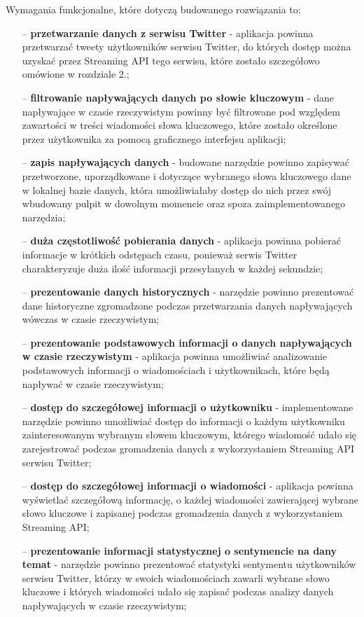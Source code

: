 Wymagania funkcjonalne, które dotyczą budowanego rozwiązania to: 
\begin{itemize}
	\item[--] \textbf{przetwarzanie danych z serwisu Twitter} - aplikacja powinna przetwarzać tweety użytkowników serwisu Twitter, do których dostęp można uzyskać przez Streaming API tego serwisu, które zostało szczegółowo omówione w rozdziale 2.; 
	\item[--] \textbf{filtrowanie napływających danych po słowie kluczowym} - dane napływające w czasie rzeczywistym powinny być filtrowane pod względem zawartości w treści wiadomości słowa kluczowego, które zostało określone przez użytkownika za pomocą graficznego interfejsu aplikacji;
	\item[--] \textbf{zapis napływających danych} - budowane narzędzie powinno zapisywać przetworzone, uporządkowane i dotyczące wybranego słowa kluczowego dane w lokalnej bazie danych, która umożliwiałaby dostęp do nich przez swój wbudowany pulpit w dowolnym momencie oraz spoza zaimplementowanego narzędzia;
	\item[--] \textbf{duża częstotliwość pobierania danych} - aplikacja powinna pobierać informacje w krótkich odstępach czasu, ponieważ serwis Twitter charakteryzuje duża ilość informacji przesyłanych w każdej sekundzie;
	\item[--] \textbf{prezentowanie danych historycznych} - narzędzie powinno prezentować dane historyczne zgromadzone podczas przetwarzania danych napływających wówczas w czasie rzeczywistym;
	\item[--] \textbf{prezentowanie podstawowych informacji o danych napływających w czasie rzeczywistym} - aplikacja powinna umożliwiać analizowanie podstawowych informacji o wiadomościach i użytkownikach, które będą napływać w czasie rzeczywistym;
	\item[--] \textbf{dostęp do szczegółowej informacji o użytkowniku} - implementowane narzędzie powinno umożliwiać dostęp do informacji o każdym użytkowniku zainteresowanym wybranym słowem kluczowym, którego wiadomość udało się zarejestrować podczas gromadzenia danych z wykorzystaniem Streaming API serwisu Twitter;
	\item[--] \textbf{dostęp do szczegółowej informacji o wiadomości} - aplikacja powinna wyświetlać szczegółową informację, o każdej wiadomości zawierającej wybrane słowo kluczowe i zapisanej podczas gromadzenia danych z wykorzystaniem Streaming API;
	\item[--] \textbf{prezentowanie informacji statystycznej o sentymencie na dany temat} - narzędzie powinno prezentować statystyki sentymentu użytkowników serwisu Twitter, którzy w swoich wiadomościach zawarli wybrane słowo kluczowe i których wiadomości udało się zapisać podczas analizy danych napływających w czasie rzeczywistym;

\end{itemize}
